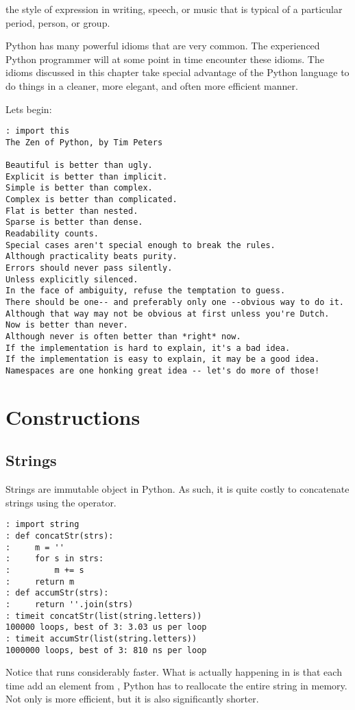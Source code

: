 \label{lab:Extensions_Idioms}


\begin{definition}[Idiom]
the style of expression in writing, speech, or music that is typical of a particular period, person, or group.
\end{definition}

Python has many powerful idioms that are very common.  The experienced Python programmer will at some point in time encounter these idioms.  The idioms discussed in this chapter take special advantage of the Python language to do things in a cleaner, more elegant, and often more efficient manner.

Lets begin:
\begin{lstlisting}
: import this
The Zen of Python, by Tim Peters

Beautiful is better than ugly.
Explicit is better than implicit.
Simple is better than complex.
Complex is better than complicated.
Flat is better than nested.
Sparse is better than dense.
Readability counts.
Special cases aren't special enough to break the rules.
Although practicality beats purity.
Errors should never pass silently.
Unless explicitly silenced.
In the face of ambiguity, refuse the temptation to guess.
There should be one-- and preferably only one --obvious way to do it.
Although that way may not be obvious at first unless you're Dutch.
Now is better than never.
Although never is often better than *right* now.
If the implementation is hard to explain, it's a bad idea.
If the implementation is easy to explain, it may be a good idea.
Namespaces are one honking great idea -- let's do more of those!
\end{lstlisting}

\section*{Constructions}

\subsection*{Strings}
Strings are immutable object in Python.  As such, it is quite costly to concatenate strings using the \li{+} operator.
\begin{lstlisting}
: import string
: def concatStr(strs):
:     m = ''
:     for s in strs:
:         m += s
:     return m
: def accumStr(strs):
:     return ''.join(strs)
: timeit concatStr(list(string.letters))
100000 loops, best of 3: 3.03 us per loop
: timeit accumStr(list(string.letters))
1000000 loops, best of 3: 810 ns per loop
\end{lstlisting}
Notice that  runs considerably faster.  What is actually happening in  is that each time add an element from , Python has to reallocate the entire string in memory.  Not only is  more efficient, but it is also significantly shorter.


